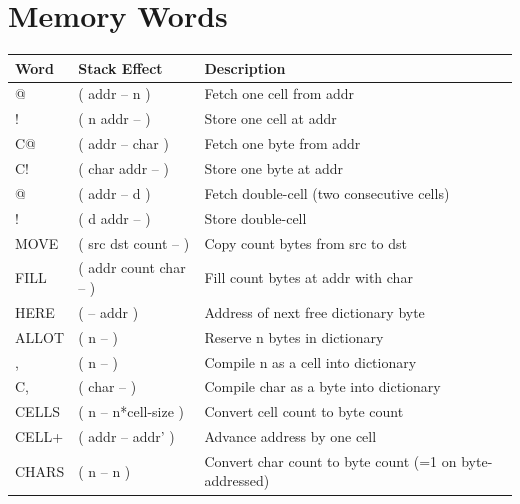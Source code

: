 \section*{Memory Words}
\begin{longtable}{>{\ttfamily}lp{4.5cm}p{7cm}}
\toprule
\normalfont Word & Stack Effect & Description \\
\midrule
\endhead
\bottomrule
\endfoot
@       & ( addr -- n )       & Fetch one cell from addr \\
!       & ( n addr -- )       & Store one cell at addr \\
C@      & ( addr -- char )    & Fetch one byte from addr \\
C!      & ( char addr -- )    & Store one byte at addr \\
2@      & ( addr -- d )       & Fetch double-cell (two consecutive cells) \\
2!      & ( d addr -- )       & Store double-cell \\
MOVE    & ( src dst count -- ) & Copy count bytes from src to dst \\
FILL    & ( addr count char -- ) & Fill count bytes at addr with char \\
HERE    & ( -- addr )         & Address of next free dictionary byte \\
ALLOT   & ( n -- )            & Reserve n bytes in dictionary \\
,       & ( n -- )            & Compile n as a cell into dictionary \\
C,      & ( char -- )         & Compile char as a byte into dictionary \\
CELLS   & ( n -- n*cell-size ) & Convert cell count to byte count \\
CELL+   & ( addr -- addr' )   & Advance address by one cell \\
CHARS   & ( n -- n )          & Convert char count to byte count (=1 on byte-addressed) \\
\end{longtable}

